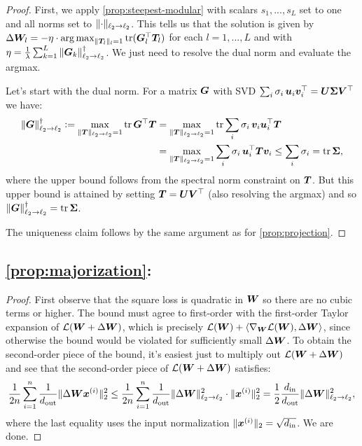 \begin{proof}
First, we apply \cref{prop:steepest-modular} with scalars $s_1,...,s_L$ set to one and all norms set to $\Vert {\cdot} \Vert_{\ell_2\to\ell_2}$. This tells us that the solution is given by $\Delta {\bm{W}}_l = - \eta\cdot \operatorname*{arg\,max}_{\Vert {{\bm{T}}_l} \Vert_l=1} \operatorname{tr}({\bm{G}}_l^\top {\bm{T}}_l)$ for each $l=1,...,L$ and with $\eta = \frac{1}{\lambda}\sum_{k=1}^L \Vert {{\bm{G}}_k} \Vert_{\ell_2\to\ell_2}^\dagger$. We just need to resolve the dual norm and evaluate the argmax.

Let's start with the dual norm. For a matrix ${\bm{G}}$ with SVD $\sum_i \sigma_i \, {\bm{u}}_i {\bm{v}}_i^\top = {\bm{U}} {\bm{\Sigma}} {\bm{V}}^\top$ we have:
\begin{align}
    \Vert {{\bm{G}}} \Vert_{\ell_2\to\ell_2}^\dagger \vcentcolon= \max_{\Vert {{\bm{T}}} \Vert_{\ell_2\to\ell_2}=1}\operatorname{tr} {\bm{G}}^\top {\bm{T}} &= \max_{\Vert {{\bm{T}}} \Vert_{\ell_2\to\ell_2}=1} \operatorname{tr} \sum_i \sigma_i \, {\bm{v}}_i {\bm{u}}_i^\top {\bm{T}} \\ &= \max_{\Vert {{\bm{T}}} \Vert_{\ell_2\to\ell_2}=1}\sum_i \sigma_i\, {\bm{u}}_i^\top {\bm{T}} {\bm{v}}_i \leq \sum_i \sigma_i = \operatorname{tr} {\bm{\Sigma}},
\end{align}
where the upper bound follows from the spectral norm constraint on ${\bm{T}}$. But this upper bound is attained by setting ${\bm{T}} = {\bm{U}}{\bm{V}}^\top$ (also resolving the argmax) and so $\Vert {{\bm{G}}} \Vert_{\ell_2\to\ell_2}^\dagger = \operatorname{tr} {\bm{\Sigma}}$.

The uniqueness claim follows by the same argument as for \cref{prop:projection}. \end{proof}

\subsection*{\cref{prop:majorization}: } \label{proof:majorization}

\begin{proof}
    First observe that the square loss is quadratic in ${\bm{W}}$ so there are no cubic terms or higher. The bound must agree to first-order with the first-order Taylor expansion of $\mathcal{L}({\bm{W}}+\Delta {\bm{W}})$, which is precisely $\mathcal{L}({\bm{W}}) + \langle\nabla_{\bm{W}} \mathcal{L}({\bm{W}}), \Delta {\bm{W}}\rangle$, since otherwise the bound would be violated for sufficiently small $\Delta{\bm{W}}$. To obtain the second-order piece of the bound, it's easiest just to multiply out $\mathcal{L}({\bm{W}}+\Delta{\bm{W}})$ and see that the second-order piece of $\mathcal{L}({\bm{W}}+\Delta {\bm{W}})$ satisfies:
    \begin{align}
        \frac{1}{2n}\sum_{i=1}^n\frac{1}{d_{\mathrm{out}}}\Vert {\Delta {\bm{W}}{\bm{x}}^{(i)}} \Vert_2^2 \leq \frac{1}{2n}\sum_{i=1}^n\frac{1}{d_{\mathrm{out}}}\Vert {\Delta {\bm{W}}} \Vert_{\ell_2\to\ell_2}^2 \cdot \Vert {{\bm{x}}^{(i)}} \Vert_2^2
        =\frac{1}{2}\frac{d_{\mathrm{in}}}{d_{\mathrm{out}}}\Vert {\Delta {\bm{W}}} \Vert_{\ell_2\to\ell_2}^2,
    \end{align}
    where the last equality uses the input normalization $\Vert {{\bm{x}}^{(i)}} \Vert_2 = \sqrt{d_{\mathrm{in}}}$. We are done.
\end{proof}

